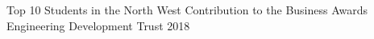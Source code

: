\begin{cvhonors}
      \cvhonor
        {Top 10 Students in the North West} %
        {Contribution to the Business Awards} %
        {Engineering Development Trust} %
        {2018} %
\end{cvhonors}
